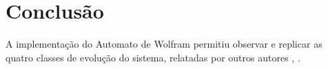 
\section{Conclusão}

A implementação do Automato de Wolfram permitiu observar e replicar as quatro
classes de evolução do sistema, relatadas por outros autores
\cite{Atman:2002:Sistemas:Complexos}, \cite{2002:Wolfram:New:Science}.
